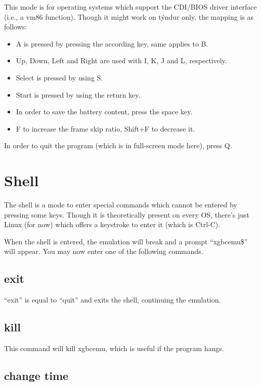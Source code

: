 \documentclass[fleqn,english,openany]{scrbook}
\begin{document}
This mode is for operating systems which support the CDI/BIOS driver interface (i.e., a vm86 function). Though it might
work on týndur only, the mapping is as follows:

\begin{itemize}
\item A is pressed by pressing the according key, same applies to B.
\item Up, Down, Left and Right are used with I, K, J and L, respectively.
\item Select is pressed by using S.
\item Start is pressed by using the return key.
\item In order to save the battery content, press the space key.
\item F to increase the frame skip ratio, Shift+F to decrease it.
\end{itemize}

In order to quit the program (which is in full-screen mode here), press Q.


\section{Shell}

The shell is a mode to enter special commands which cannot be entered by pressing some keys. Though it is theoretically
present on every OS, there's just Linux (for now) which offers a keystroke to enter it (which is Ctrl-C).

When the shell is entered, the emulation will break and a prompt “xgbcemu\$” will appear. You may now enter one of the
following commands.

\subsection{exit}

“exit” is equal to “quit” and exits the shell, continuing the emulation.

\subsection{kill}

This command will kill xgbcemu, which is useful if the program hangs.

\subsection{change time}
\end{document}

